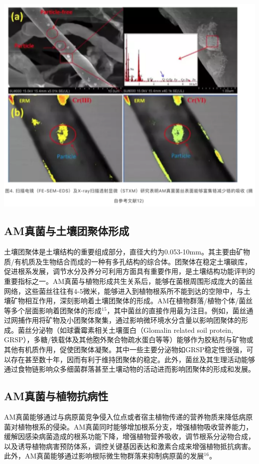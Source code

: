 \documentclass[]{book}
\begin{document}
\includegraphics[width=6.67in]{images/am4}

\subsection{AM真菌与土壤团聚体形成}\label{am}

土壤团聚体是土壤结构的重要组成部分，直径大约为0.053-10mm。其主要由矿物质/有机质及生物结合而成的一种有多孔结构的综合体。团聚体在稳定土壤碳库，促进根系发展，调节水分及养分可利用方面具有重要作用，是土壤结构功能评判的重要指标之一。AM真菌与植物形成共生关系后，能够在菌根周围形成庞大的菌丝网络，这些菌丝往往有4-5微米，能够进入到植物根系所不能到达的空隙中，与土壤矿物相互作用，深刻影响着土壤团聚体的形成。AM在植物群落/植物个体/菌丝等多个层面影响着团聚体的形成\(^{15}\)，其中菌丝的直接作用最为注目。例如，菌丝通过网捕作用将矿物及小团聚体聚集，通过影响微环境水分含量以影响团聚体的形成。菌丝分泌物（如球囊霉素相关土壤蛋白（Glomalin
related soil protein,
GRSP），多糖/铁载体及其他胞外聚合物疏水蛋白等等）能够作为胶粘剂与矿物或其他有机质作用，促使团聚体凝聚。其中一些主要分泌物如GRSP稳定性很强，可以存在甚至数十年，因而有利于维持团聚体的稳定。此外，菌丝及其生理活动能够通过食物链影响众多细菌群落甚至土壤动物的活动进而影响团聚体的形成和发展。

\subsection{AM真菌与植物抗病性}\label{am}

AM真菌能够通过与病原菌竞争侵入位点或者宿主植物传递的营养物质来降低病原菌对植物根系的侵染。AM真菌同时能够增加根系分支，增强植物吸收营养能力，缓解因感染病菌造成的根系功能下降，增强植物营养吸收，调节根系分泌物合成，以及诱导植物病害预防体系，调控关键基因表达和激素合成来增强植物抵抗病害。此外，AM真菌能够通过影响根际微生物群落来抑制病原菌的发展\(^{16}\)。
\end{document}
